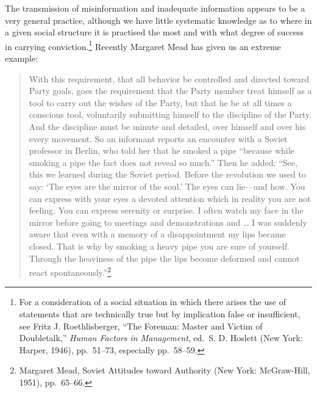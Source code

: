 \documentclass[twoside,symmetric,nobib,justified]{tufte-book}
\begin{document}
The transmission of misinformation and inadequate in­formation appears to
be a very general practice, although we have little systematic knowledge
as to where in a given social structure it is practised the most and
with what degree of success in carrying conviction.\footnote{For a
  consideration of a social situation in which there arises the use of
  statements that are technically true but by im­plication false or
  insufficient, see Fritz J. Roethlisberger, ``The Foreman: Master and
  Victim of Doubletalk,'' \emph{Human Factors in Management}, ed.~S. D.
  Hoslett (New York: Harper, 1946), pp.~51--73, especially pp.~58--59.}
Recently Margaret Mead has given us an extreme example:

\begin{quote}
With this requirement, that all behavior be controlled and directed
toward Party goals, goes the requirement that the Party member treat
himself as a tool to carry out the wishes of the Party, but that he be
at all times a conscious tool, voluntarily submitting himself to the
discipline of the Party. And the discipline must be minute and detailed,
over himself and over his every movement. So an informant reports an
encounter with a Soviet professor in Berlin, who told her that he smoked
a pipe ``because while smoking a pipe the fact does not reveal so
much.'' Then he added: ``See, this we learned during the Soviet period.
Before the revolution we used to say: `The eyes are the mirror of the
soul.' The eyes can lie---and how. You can express with your eyes a
devoted attention which in reality you are not feeling. You can express
serenity or surprise. I often watch my face in the mirror before going
to meetings and demonstrations and \ldots{} I was suddenly aware that
even with a memory of a disappointment my lips became closed. That is
why by smoking a heavy pipe you are sure of yourself. Through the
heaviness of the pipe the lips become deformed and cannot react
spontaneously.''\footnote{Margaret Mead, Soviet Attitudes toward
  Authority (New York: McGraw-Hill, 1951), pp.~65--66.}
\end{quote}
\end{document}
